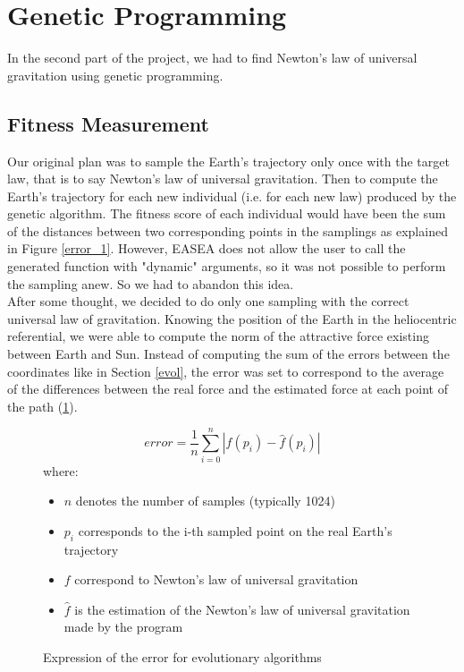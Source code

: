 \section{Genetic Programming}
In the second part of the project, we had to find Newton's law of universal
gravitation using genetic programming.

\subsection{Fitness Measurement}
Our original plan was to sample the Earth's trajectory only once with the
target law, that is to say Newton's law of universal gravitation. Then to
compute the Earth's trajectory for each new individual (i.e. for each new law)
produced by the genetic algorithm. The fitness score of each individual would
have been the sum of the distances between two corresponding points in the
samplings as explained in Figure \ref{error_1}. However, EASEA does not allow
the
user to call the generated function with
"dynamic" arguments, so it was not possible to perform the sampling anew. So we
had to abandon this idea.\\

After some thought, we decided to do only one sampling with the correct
universal law of gravitation. Knowing the position of the Earth in the
heliocentric referential, we were able to compute the norm of the attractive
force existing between Earth and Sun. Instead of computing the sum of the
errors between the coordinates like in Section \ref{evol}, the error was set to
correspond to the average of the differences between the real force and the
estimated force at each point of the path (\Figure \ref{error_2}).\\

\begin{figure}
    \[ error = \frac{1}{n} \sum_{i=0}^{n} | f(p_{i}) - \hat{f}(p_{i}) | \]
    where:
    \begin{itemize}
        \item \(n\) denotes the number of samples (typically 1024)
        \item \(p_{i}\) corresponds to the i-th sampled point on the real
              Earth's
              trajectory
        \item \(f\) correspond to Newton's law of universal gravitation
        \item \(\hat{f}\) is the estimation of the Newton's law of universal
              gravitation made by the program
    \end{itemize}
    \caption{Expression of the error for evolutionary algorithms}
    \label{error_2}
\end{figure}


